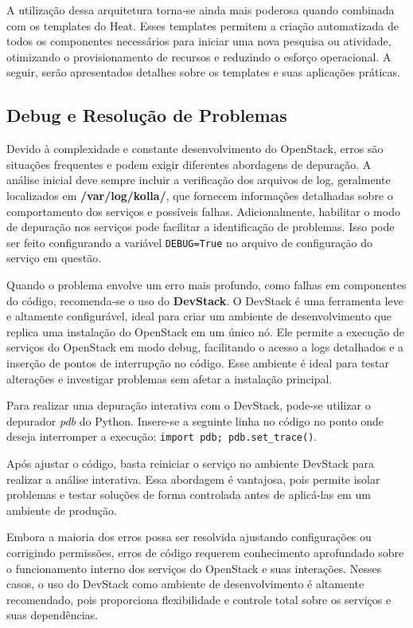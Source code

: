 A utilização dessa arquitetura torna-se ainda mais poderosa quando combinada com os templates do Heat. Esses templates permitem a criação automatizada de todos os componentes necessários para iniciar uma nova pesquisa ou atividade, otimizando o provisionamento de recursos e reduzindo o esforço operacional. A seguir, serão apresentados detalhes sobre os templates e suas aplicações práticas.

\subsection{Debug e Resolução de Problemas}
Devido à complexidade e constante desenvolvimento do OpenStack, erros são situações frequentes e podem exigir diferentes abordagens de depuração. A análise inicial deve sempre incluir a verificação dos arquivos de log, geralmente localizados em \textbf{/var/log/kolla/}, que fornecem informações detalhadas sobre o comportamento dos serviços e possíveis falhas. Adicionalmente, habilitar o modo de depuração nos serviços pode facilitar a identificação de problemas. Isso pode ser feito configurando a variável \texttt{DEBUG=True} no arquivo de configuração do serviço em questão.

Quando o problema envolve um erro mais profundo, como falhas em componentes do código, recomenda-se o uso do \textbf{DevStack}. O DevStack é uma ferramenta leve e altamente configurável, ideal para criar um ambiente de desenvolvimento que replica uma instalação do OpenStack em um único nó. Ele permite a execução de serviços do OpenStack em modo debug, facilitando o acesso a logs detalhados e a inserção de pontos de interrupção no código. Esse ambiente é ideal para testar alterações e investigar problemas sem afetar a instalação principal.

Para realizar uma depuração interativa com o DevStack, pode-se utilizar o depurador \textit{pdb} do Python. Insere-se a seguinte linha no código no ponto onde deseja interromper a execução: \texttt{import pdb; pdb.set\_trace()}.

Após ajustar o código, basta reiniciar o serviço no ambiente DevStack para realizar a análise interativa. Essa abordagem é vantajosa, pois permite isolar problemas e testar soluções de forma controlada antes de aplicá-las em um ambiente de produção.

Embora a maioria dos erros possa ser resolvida ajustando configurações ou corrigindo permissões, erros de código requerem conhecimento aprofundado sobre o funcionamento interno dos serviços do OpenStack e suas interações. Nesses casos, o uso do DevStack como ambiente de desenvolvimento é altamente recomendado, pois proporciona flexibilidade e controle total sobre os serviços e suas dependências.

